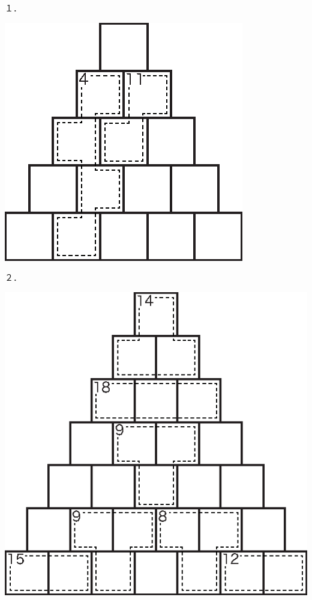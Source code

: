 \documentclass[./main]{subfiles}
\begin{document}
\begin{minipage}{0.4375\hsize}
\vspace{15pt}１．\vspace{-15pt}
\begin{center}
\includegraphics{manuscript/morikawa_image/morikawa_puzzle_1.eps}
\end{center}
\vspace{15pt}２．\vspace{-15pt}
\begin{center}
\includegraphics{manuscript/morikawa_image/morikawa_puzzle_2.eps}
\end{center}
\end{minipage}
\end{document}

